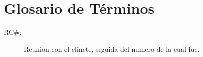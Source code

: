 \section{Glosario de Términos}

\begin{description}
	\item[RC\#:] Reunion con el clinete, seguida del numero de la cual fue.
\end{description}







